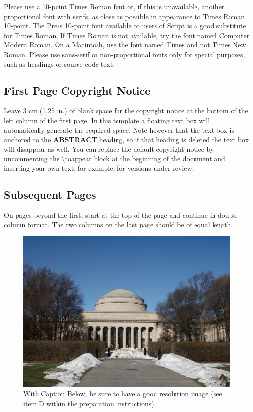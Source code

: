 \documentclass{sigchi}
\begin{document}
Please use a 10-point Times Roman font or, if this is unavailable,
another proportional font with serifs, as close as possible in
appearance to Times Roman 10-point. The Press 10-point font available
to users of Script is a good substitute for Times Roman. If Times
Roman is not available, try the font named Computer Modern Roman. On a
Macintosh, use the font named Times and not Times New Roman. Please
use sans-serif or non-proportional fonts only for special purposes,
such as headings or source code text.

\subsection{First Page Copyright Notice}

Leave 3 cm (1.25 in.) of blank space for the copyright notice at the
bottom of the left column of the first page. In this template a
floating text box will automatically generate the required space. Note
however that the text box is anchored to the \textbf{ABSTRACT}
heading, so if that heading is deleted the text box will disappear as
well.  You can replace the default copyright notice by uncommenting
the {\textbackslash}toappear block at the beginning of the document
and inserting your own text, for example, for versions under review.

\subsection{Subsequent Pages}

On pages beyond the first, start at the top of the page and continue
in double-column format.  The two columns on the last page should be
of equal length.

\begin{figure}[!h]
\centering
\includegraphics[width=0.9\columnwidth]{Figure1}
\caption{With Caption Below, be sure to have a good resolution image
  (see item D within the preparation instructions).}
\label{fig:figure1}
\end{figure}
\end{document}
